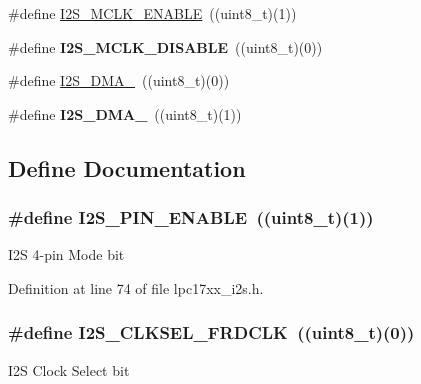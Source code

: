 \begin{DoxyCompactItemize}
\item 
\#define \hyperlink{group___i2_s___public___macros_ga1d6e7b12323fb3c8f341943afe596a43}{\-I2\-S\-\_\-\-M\-C\-L\-K\-\_\-\-E\-N\-A\-B\-L\-E}~((uint8\-\_\-t)(1))
\item 
\hypertarget{group___i2_s___public___macros_gab90c0b28af0c533279ee6543713d54f0}{\#define {\bfseries \-I2\-S\-\_\-\-M\-C\-L\-K\-\_\-\-D\-I\-S\-A\-B\-L\-E}~((uint8\-\_\-t)(0))}\label{group___i2_s___public___macros_gab90c0b28af0c533279ee6543713d54f0}

\item 
\#define \hyperlink{group___i2_s___public___macros_ga75aefb3a3233a2f0b37dbeb544d86403}{\-I2\-S\-\_\-\-D\-M\-A\-\_}~((uint8\-\_\-t)(0))
\item 
\hypertarget{group___i2_s___public___macros_gaf0c49a0c237fa696257be6158305eb38}{\#define {\bfseries \-I2\-S\-\_\-\-D\-M\-A\-\_}~((uint8\-\_\-t)(1))}\label{group___i2_s___public___macros_gaf0c49a0c237fa696257be6158305eb38}

\end{DoxyCompactItemize}


\subsection{\-Define \-Documentation}
\hypertarget{group___i2_s___public___macros_ga5c513203b6ebe05f3c82b7cec3f16a7f}{
\subsubsection[{\-I2\-S\-\_\-4\-P\-I\-N\-\_\-\-E\-N\-A\-B\-L\-E}]{\setlength{\rightskip}{0pt plus 5cm}\#define {\bf \-I2\-S\-\_\-P\-I\-N\-\_\-\-E\-N\-A\-B\-L\-E}~((uint8\-\_\-t)(1))}}\label{group___i2_s___public___macros_ga5c513203b6ebe05f3c82b7cec3f16a7f}
\-I2\-S 4-\/pin \-Mode bit 

\-Definition at line 74 of file lpc17xx\-\_\-i2s.\-h.

\hypertarget{group___i2_s___public___macros_gafe1dcaaac6d82875528aef5b6f77cc14}{
\subsubsection[{\-I2\-S\-\_\-\-C\-L\-K\-S\-E\-L\-\_\-\-F\-R\-D\-C\-L\-K}]{\setlength{\rightskip}{0pt plus 5cm}\#define {\bf \-I2\-S\-\_\-\-C\-L\-K\-S\-E\-L\-\_\-\-F\-R\-D\-C\-L\-K}~((uint8\-\_\-t)(0))}}\label{group___i2_s___public___macros_gafe1dcaaac6d82875528aef5b6f77cc14}
\-I2\-S \-Clock \-Select bit 

